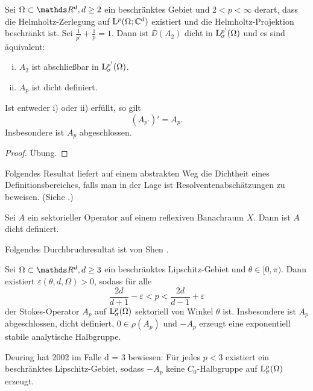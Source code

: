 \begin{prop}
  Sei $\Omega \subset \R^d, d\geq 2$ ein beschränktes Gebiet und $2 < p < \infty$ derart, dass die Helmholtz-Zerlegung auf $\mathrm{L}^p(\Omega; \mathbb{C}^d)$ existiert und die Helmholtz-Projektion beschränkt ist.
  Sei $\frac{1}{p'} + \frac{1}{p} = 1$.
  Dann ist $\DD(A_2)$ dicht in $\mathrm{L}_\sigma^{p'}(\Omega)$ und es sind äquivalent:
  \begin{enumerate}[i)]
    \item $A_2$ ist abschließbar in $\mathrm{L}_\sigma^{p'}(\Omega)$.
    \item $A_p$ ist dicht definiert.
  \end{enumerate}
  Ist entweder i) oder ii) erfüllt, so gilt
  $$
  (A_{p'})' = A_p.
  $$
  Insbesondere ist $A_p$ abgeschlossen.
\end{prop}

\begin{proof}
  Übung.
\end{proof}

Folgendes Resultat liefert auf einem abstrakten Weg die Dichtheit eines Definitionsbereiches, falls man in der Lage ist Resolventenabschätzungen zu beweisen.  (Siehe \cite[Prop. 2.1.1]{haase}.)

\begin{thm}
  Sei $A$ ein sektorieller Operator auf einem reflexiven Banachraum $X$.
  Dann ist $A$ dicht definiert.
\end{thm}

Folgendes Durchbruchresultat ist von Shen \cite{shen}.

\begin{hsatz}
  \label{hsatz:shen}
  Sei $\Omega \subset \R^d, d \geq 3$ ein beschränktes Lipschitz-Gebiet und $\theta \in [0,\pi)$.
    Dann existiert $\varepsilon(\theta, d, \Omega) > 0$, sodass für alle
    $$
    \frac{2d}{d + 1} - \varepsilon < p < \frac{2d}{d - 1} + \varepsilon
    $$
    der Stokes-Operator $A_p$ auf $\mathrm{L}_\sigma^p(\Omega)$ sektoriell von Winkel $\theta$ ist.
    Insbesondere ist $A_p$ abgeschlossen, dicht definiert, $0 \in \rho(A_p)$ und  $-A_p$ erzeugt eine exponentiell stabile analytische Halbgruppe.
\end{hsatz}

\begin{rem}
  Deuring hat 2002 im Falle d = 3 bewiesen: Für jedes $p < 3$ existiert ein beschränktes Lipschitz-Gebiet, sodass $-A_p$ keine $C_0$-Halbgruppe auf $\mathrm{L}_\sigma^p(\Omega)$ erzeugt.
\end{rem}

